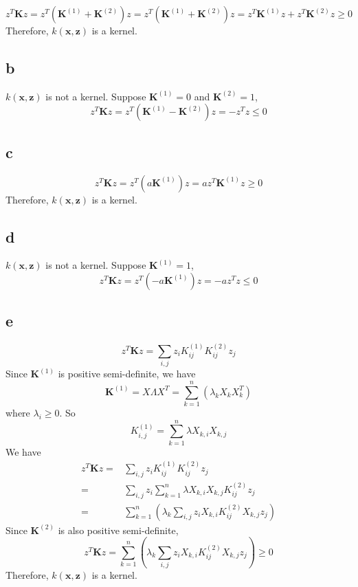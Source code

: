 \documentclass{article}
\begin{document}
$$z^T \mathbf{K} z = z^T (\mathbf{K}^{(1)} + \mathbf{K}^{(2)}) z = z^T (\mathbf{K}^{(1)} + \mathbf{K}^{(2)}) z = z^T \mathbf{K}^{(1)}z + z^T \mathbf{K}^{(2)} z \geq 0$$
Therefore, $k(\mathbf{x}, \mathbf{z})$ is a kernel.

\subsection*{b}

$k(\mathbf{x}, \mathbf{z})$ is not a kernel. Suppose $\mathbf{K}^{(1)} = 0$ and $\mathbf{K}^{(2)} = 1$,
$$z^T \mathbf{K} z = z^T (\mathbf{K}^{(1)} - \mathbf{K}^{(2)}) z = - z^T z \leq 0$$

\subsection*{c}

$$z^T \mathbf{K} z = z^T (a \mathbf{K}^{(1)}) z = a z^T \mathbf{K}^{(1)} z \geq 0$$
Therefore, $k(\mathbf{x}, \mathbf{z})$ is a kernel.

\subsection*{d}

$k(\mathbf{x}, \mathbf{z})$ is not a kernel. Suppose $\mathbf{K}^{(1)} = 1$,
$$z^T \mathbf{K} z = z^T (-a \mathbf{K}^{(1)}) z =  - a z^T z \leq 0$$

\subsection*{e}

$$z^T \mathbf{K} z = \sum_{i, j} z_i K^{(1)}_{ij} K^{(2)}_{ij} z_j$$
Since $\mathbf{K}^{(1)}$ is positive semi-definite, we have
$$\mathbf{K}^{(1)} = X \varLambda X^T =\sum_{k=1}^{n} (\lambda_k X_k X_k^T)$$
where $\lambda_i \geq 0$. So
$$K^{(1)}_{i,j} = \sum_{k=1}^{n} \lambda X_{k,i} X_{k, j}$$
We have
$$
\begin{aligned}
z^T \mathbf{K} z = & \sum_{i, j} z_i K^{(1)}_{ij} K^{(2)}_{ij} z_j \\
= & \sum_{i, j} z_i \sum_{k=1}^{n} \lambda X_{k,i} X_{k, j} K^{(2)}_{ij} z_j \\
= & \sum_{k=1}^{n} (\lambda_k \sum_{i,j} z_i X_{k,i} K^{(2)}_{ij} X_{k,j} z_j)
\end{aligned}
$$
Since $\mathbf{K}^{(2)}$ is also positive semi-definite,
$$z^T \mathbf{K} z = \sum_{k=1}^{n} (\lambda_k \sum_{i,j} z_i X_{k,i} K^{(2)}_{ij} X_{k,j} z_j) \geq 0$$
Therefore, $k(\mathbf{x}, \mathbf{z})$ is a kernel.
\end{document}
